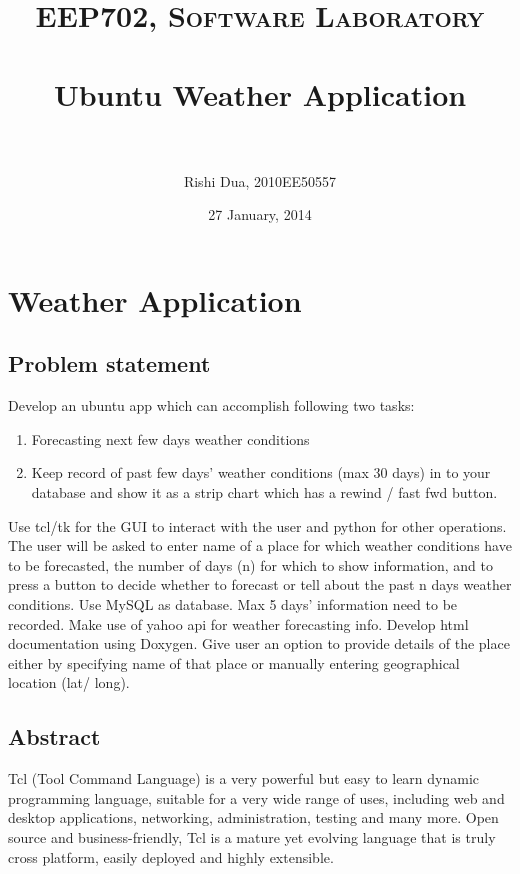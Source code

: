 \documentclass[paper=a4, fontsize=11pt]{scrartcl} %
\title{	
\normalfont \normalsize 
\textsc{EEP702, Software Laboratory} \\ [25pt] %
\horrule{0.5pt} \\[0.4cm] %
\huge Ubuntu Weather Application \\ %
\horrule{2pt} \\[0.5cm] %
}
\author{Rishi Dua, 2010EE50557} %
\date{\normalsize 27 January, 2014} %
\numberwithin{equation}{section} %
\numberwithin{figure}{section} %
\numberwithin{table}{section} %
\begin{document}
\maketitle %


\section{Weather Application}


\subsection{Problem statement}
Develop an ubuntu app which can accomplish following two tasks:
\begin{enumerate}
\item Forecasting next few days weather conditions
\item Keep record of past few days' weather conditions (max 30 days) in to your database and show it as a strip chart which has a rewind / fast fwd button.
\end{enumerate}
 
Use tcl/tk for the GUI to interact with the user and python for other operations. The user will be asked to enter name of a place for which weather conditions have to be forecasted, the number of days (n) for which to show information, and to press a button to decide whether to forecast or tell about the past n days weather conditions. Use MySQL as database. Max 5 days' information need to be recorded. Make use of yahoo api for weather forecasting info. Develop html documentation using Doxygen. Give user an option to provide details of the place either by specifying name of that place or manually entering geographical location (lat/ long).


\subsection{Abstract}

Tcl (Tool Command Language) is a very powerful but easy to learn dynamic programming language, suitable for a very wide range of uses, including web and desktop applications, networking, administration, testing and many more. Open source and business-friendly, Tcl is a mature yet evolving language that is truly cross platform, easily deployed and highly extensible.\\
\end{document}
